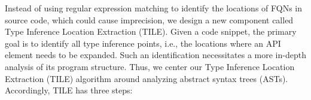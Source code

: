 


Instead of using regular expression matching to identify the locations
of FQNs in source code, which could cause imprecision, we design
a new component called Type Inference Location Extraction (TILE).
%
Given a code snippet, the primary goal is to identify all type inference points, i.e., the locations where an API element needs to be expanded. Such an identification necessitates a more in-depth analysis of its program structure. Thus, we center our Type Inference Location Extraction (TILE) algorithm around analyzing abstract syntax trees (ASTs). Accordingly, TILE has three steps:

